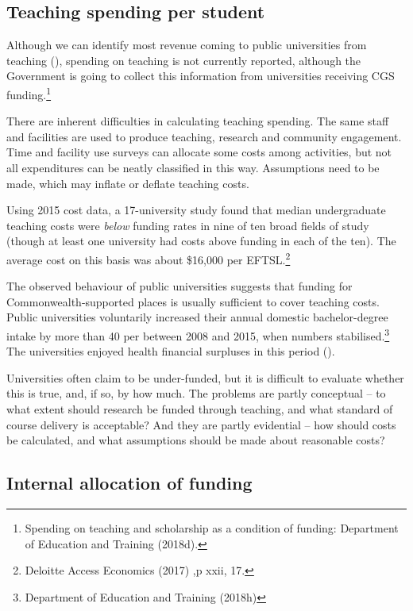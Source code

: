 \documentclass{grattan}
\begin{document}
%
\subsection{Teaching spending per student}\label{subsec:teaching-spending-per-student}

Although we can identify most revenue coming to public universities from teaching (), spending on teaching is not currently reported, although the Government is going to collect this information from universities receiving CGS funding.\footnote{Spending on teaching and scholarship as a condition of funding: Department of Education and Training (2018d).}

There are inherent difficulties in calculating teaching spending. The same staff and facilities are used to produce teaching, research and community engagement. Time and facility use surveys can allocate some costs among activities, but not all expenditures can be neatly classified in this way. Assumptions need to be made, which may inflate or deflate teaching costs.

Using 2015 cost data, a 17-university study found that median undergraduate teaching costs were \emph{below} funding rates in nine of ten broad fields of study (though at least one university had costs above funding in each of the ten). The average cost on this basis was about \$16,000 per EFTSL.\footnote{Deloitte Access Economics (2017) ,p xxii, 17.}

The observed behaviour of public universities suggests that funding for Commonwealth-supported places is usually sufficient to cover teaching costs. Public universities voluntarily increased their annual domestic bachelor-degree intake by more than 40 per between 2008 and 2015, when numbers stabilised.\footnote{Department of Education and Training (2018h)} The universities enjoyed health financial surpluses in this period ().

Universities often claim to be under-funded, but it is difficult to evaluate whether this is true, and, if so, by how much. The problems are partly conceptual -- to what extent should research be funded through teaching, and what standard of course delivery is acceptable? And they are partly evidential -- how should costs be calculated, and what assumptions should be made about reasonable costs?

%
\subsection{Internal allocation of funding}\label{subsec:internal-allocation-of-funding}
\end{document}
